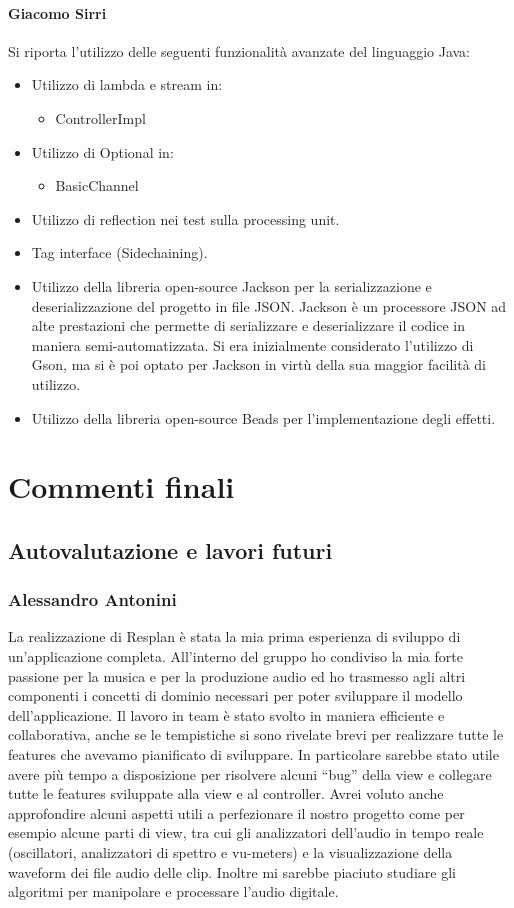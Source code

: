 \documentclass[a4paper,12pt]{report}
\begin{document}
\subsubsection{Giacomo Sirri}
Si riporta l’utilizzo delle seguenti funzionalità avanzate del linguaggio Java:
\begin{itemize}
    \item Utilizzo di lambda e stream in:
    \begin{itemize}
        \item ControllerImpl
    \end{itemize}
    \item Utilizzo di Optional in:
    \begin{itemize}
        \item BasicChannel
    \end{itemize}
    \item Utilizzo di reflection nei test sulla processing unit.
    \item Tag interface (Sidechaining).
    \item Utilizzo della libreria open-source Jackson per la serializzazione e deserializzazione del progetto in file JSON. Jackson è un processore JSON ad alte prestazioni che permette di serializzare e deserializzare il codice in maniera semi-automatizzata. Si era inizialmente considerato l’utilizzo di Gson, ma si è poi optato per Jackson in virtù della sua maggior facilità di utilizzo.
    \item Utilizzo della libreria open-source Beads per l’implementazione degli effetti.
\end{itemize}

\chapter{Commenti finali}
\section{Autovalutazione e lavori futuri}
\subsection{Alessandro Antonini}
La realizzazione di Resplan è stata la mia prima esperienza di sviluppo di un'applicazione completa. All’interno del gruppo ho condiviso la mia forte passione per la musica e per la produzione audio ed ho trasmesso agli altri componenti i concetti di dominio necessari per poter sviluppare il modello dell’applicazione.
Il lavoro in team è stato svolto in maniera efficiente e collaborativa, anche se le tempistiche si sono rivelate brevi per realizzare tutte le features che avevamo pianificato di sviluppare. In particolare sarebbe stato utile avere più tempo a disposizione per risolvere alcuni “bug” della view e collegare tutte le features sviluppate alla view e al controller.
Avrei voluto anche approfondire alcuni aspetti utili a perfezionare il nostro progetto come per esempio alcune parti di view, tra cui gli analizzatori dell’audio in tempo reale (oscillatori, analizzatori di spettro e vu-meters) e la visualizzazione della waveform dei file audio delle clip. Inoltre mi sarebbe piaciuto studiare gli algoritmi per manipolare e processare l’audio digitale.
\end{document}
